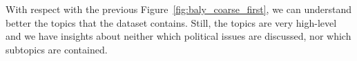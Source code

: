 With respect with the previous Figure~\ref{fig:baly_coarse_first}, we can understand better the topics that the dataset contains.
Still, the topics are very high-level and we have insights about neither which political issues are discussed, nor which subtopics are contained.












